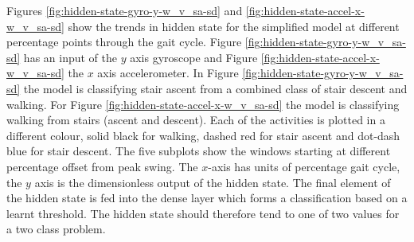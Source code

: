 \documentclass[sensors,article,submit,moreauthors,pdftex]{Definitions/mdpi}
\begin{document}
Figures \ref{fig:hidden-state-gyro-y-w_v_sa-sd} and \ref{fig:hidden-state-accel-x-w_v_sa-sd} show the trends in hidden state for the simplified model at different percentage points through the gait cycle. Figure \ref{fig:hidden-state-gyro-y-w_v_sa-sd} has an input of the $y$ axis gyroscope and Figure \ref{fig:hidden-state-accel-x-w_v_sa-sd} the $x$ axis accelerometer. In Figure \ref{fig:hidden-state-gyro-y-w_v_sa-sd} the model is classifying stair ascent from a combined class of stair descent and walking. For Figure \ref{fig:hidden-state-accel-x-w_v_sa-sd} the model is classifying walking from stairs (ascent and descent). Each of the activities is plotted in a different colour, solid black for walking, dashed red for stair ascent and dot-dash blue for stair descent. The five subplots show the windows starting at different percentage offset from peak swing. The $x$-axis has units of percentage gait cycle, the $y$ axis is the dimensionless output of the hidden state. The final element of the hidden state is fed into the dense layer which forms a classification based on a learnt threshold. The hidden state should therefore tend to one of two values for a two class problem.
\end{document}
